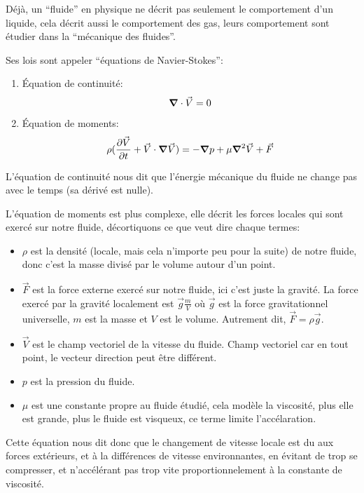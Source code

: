 \documentclass{article}
\begin{document}
Déjà, un ``fluide'' en physique ne décrit pas seulement le comportement d'un liquide, cela décrit aussi le comportement des gas, leurs comportement sont étudier dans la ``mécanique des fluides''.

Ses lois sont appeler ``équations de Navier-Stokes'':

\begin{enumerate}
    \item Équation de continuité:
        \[
            \grad \cdot \vec{V} = 0
        \]
    \item Équation de moments:
        \[
            \rho (\pdv{\vec{V}}{t} + \vec{V}\cdot \grad \vec{V}) = - \grad p  + \mu \grad ^ 2 \vec{V} + \vec{F}
        \]
\end{enumerate}

L'équation de continuité nous dit que l'énergie mécanique du fluide ne change pas avec le temps (sa dérivé est nulle).

L'équation de moments est plus complexe, elle décrit les forces locales qui sont exercé sur notre fluide, décortiquons ce que veut dire chaque termes:

\begin{itemize}
    \item \(\rho\) est la densité (locale, mais cela n'importe peu pour la suite) de notre fluide, donc c'est la masse divisé par le volume autour d'un point.
    \item \(\vec{F}\) est la force externe exercé sur notre fluide, ici c'est juste la gravité. La force exercé par la gravité localement est \(\vec{g} \frac{m}{V}\) où \(\vec{g}\) est la force gravitationnel universelle, \(m\) est la masse et \(V\) est le volume. Autrement dit, \(\vec{F} = \rho\vec{g}\).
    \item \(\vec{V}\) est le champ vectoriel de la vitesse du fluide. Champ vectoriel car en tout point, le vecteur direction peut être différent.
    \item \(p\) est la pression du fluide.
    \item \(\mu\) est une constante propre au fluide étudié, cela modèle la viscosité, plus elle est grande, plus le fluide est visqueux, ce terme limite l'accélaration.
\end{itemize}

Cette équation nous dit donc que le changement de vitesse locale est du aux forces extérieurs, et à la différences de vitesse environnantes, en évitant de trop se compresser, et n'accélérant pas trop vite proportionnelement à la constante de viscosité.
\end{document}
